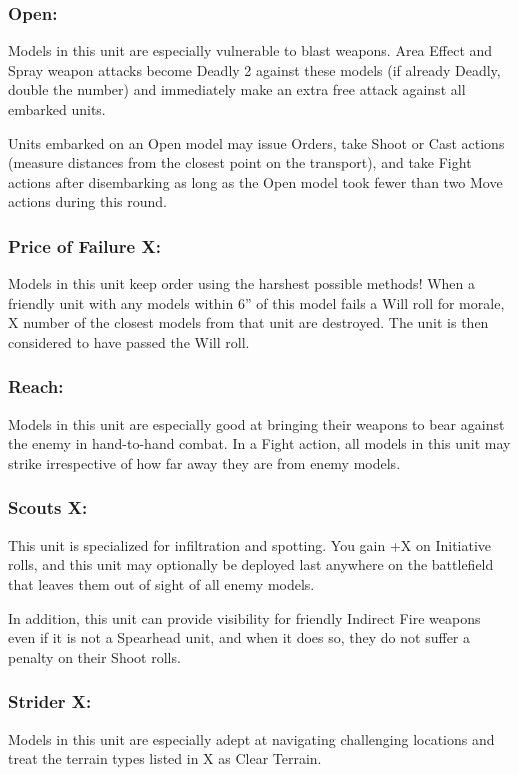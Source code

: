 \begin{multicols}{2}
\subsubsection*{Open:} Models in this unit are especially vulnerable to blast weapons. Area Effect and Spray weapon attacks become Deadly 2 against these models (if already Deadly, double the number) and immediately make an extra free attack against all embarked units.

Units embarked on an Open model may issue Orders, take Shoot or Cast actions (measure distances from the closest point on the transport), and take Fight actions after disembarking as long as the Open model took fewer than two Move actions during this round.

\subsubsection*{Price of Failure X:} Models in this unit keep order using the harshest possible methods! When a friendly unit with any models within 6'' of this model fails a Will roll for morale, X number of the closest models from that unit are destroyed. The unit is then considered to have passed the Will roll.

\subsubsection*{Reach:} Models in this unit are especially good at bringing their weapons to bear against the enemy in hand-to-hand combat. In a Fight action, all models in this unit may strike irrespective of how far away they are from enemy models.

\subsubsection*{Scouts X:} This unit is specialized for infiltration and spotting. You gain +X on Initiative rolls, and this unit may optionally be deployed last anywhere on the battlefield that leaves them out of sight of all enemy models.

In addition, this unit can provide visibility for friendly Indirect Fire weapons even if it is not a Spearhead unit, and when it does so, they do not suffer a penalty on their Shoot rolls.

\subsubsection*{Strider X:} Models in this unit are especially adept at navigating challenging locations and treat the terrain types listed in X as Clear Terrain.


\end{multicols}
